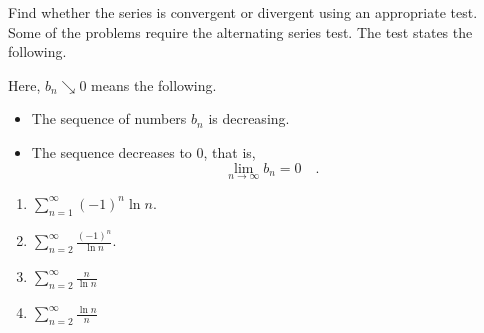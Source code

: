Find whether the series is convergent or divergent using an
appropriate test. Some of the problems require the alternating series test. The test states the following.


Here, $b_n\searrow 0$ means the following.
\begin{itemize}
\item The sequence of numbers $b_n$ is decreasing.
\item The sequence decreases to $0$, that is, 
\[\lim\limits_{n\to \infty} b_n=0\quad .
\]
\end{itemize}
%
\begin{multicols}{2}
\begin{enumerate}[ref={\fcProblemRef}]
\item \label{problemConvergencesumn=1^infty(-1)^nlnn} $\displaystyle\sum_{n=1}^{\infty} (-1)^n\ln n  . $

\item \label{problemConvergencesumn=2^infty(-1)^n/lnn} $\displaystyle \sum_{n=2}^{\infty} \frac{(-1)^n }{\ln n}  .$

\item \label{problemConvergencesum_n=2^infty(-1)^nn/ln(n)} $\displaystyle \sum\limits_{n=2}^{\infty}\frac{n}{\ln n}$

\item \label{problemConvergencesum_n=2^infty(-1)^nln(n)/n} $\displaystyle \sum\limits_{n=2}^{\infty}\frac{\ln n}{n}$

\end{enumerate}
\end{multicols}